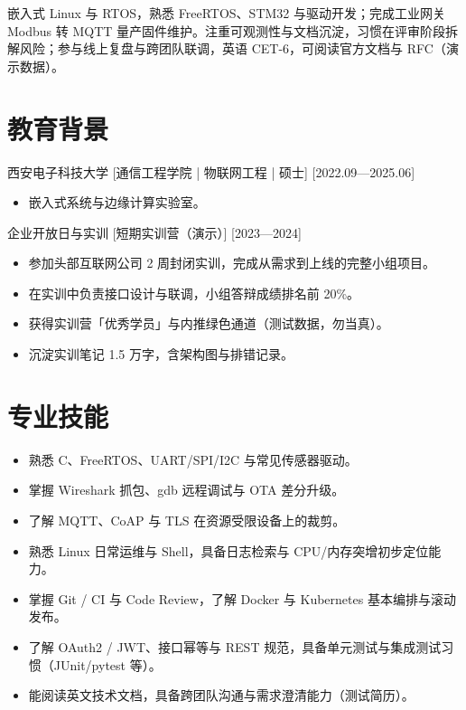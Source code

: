 \documentclass{resume-photo}
\begin{document}

\ResumeTitle

\noindent 嵌入式 Linux 与 RTOS，熟悉 FreeRTOS、STM32 与驱动开发；完成工业网关 Modbus 转 MQTT 量产固件维护。注重可观测性与文档沉淀，习惯在评审阶段拆解风险；参与线上复盘与跨团队联调，英语 CET-6，可阅读官方文档与 RFC（演示数据）。

\section{教育背景}
\ResumeItem
{西安电子科技大学}
[\textnormal{通信工程学院 | 物联网工程 | 硕士}]
[2022.09—2025.06]

\begin{itemize}
  \item 嵌入式系统与边缘计算实验室。
\end{itemize}


\ResumeItem
{企业开放日与实训}
[\textnormal{短期实训营（演示）}]
[2023—2024]

\begin{itemize}
  \item 参加头部互联网公司 2 周封闭实训，完成从需求到上线的完整小组项目。
  \item 在实训中负责接口设计与联调，小组答辩成绩排名前 20\%。
  \item 获得实训营「优秀学员」与内推绿色通道（测试数据，勿当真）。
  \item 沉淀实训笔记 1.5 万字，含架构图与排错记录。
\end{itemize}



\section{专业技能}
\begin{itemize}
  \item 熟悉 C、FreeRTOS、UART/SPI/I2C 与常见传感器驱动。
  \item 掌握 Wireshark 抓包、gdb 远程调试与 OTA 差分升级。
  \item 了解 MQTT、CoAP 与 TLS 在资源受限设备上的裁剪。
  \item 熟悉 Linux 日常运维与 Shell，具备日志检索与 CPU/内存突增初步定位能力。
  \item 掌握 Git / CI 与 Code Review，了解 Docker 与 Kubernetes 基本编排与滚动发布。
  \item 了解 OAuth2 / JWT、接口幂等与 REST 规范，具备单元测试与集成测试习惯（JUnit/pytest 等）。
  \item 能阅读英文技术文档，具备跨团队沟通与需求澄清能力（测试简历）。
\end{itemize}
\end{document}
